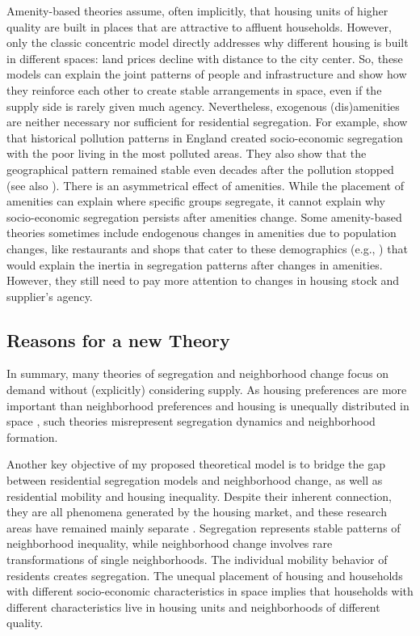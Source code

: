 \documentclass[a4paper,12pt]{article}
\begin{document}
Amenity-based theories assume, often implicitly, that housing units of higher quality are built in places that are attractive to affluent households. However, only the classic concentric model directly addresses why different housing is built in different spaces: land prices decline with distance to the city center. So, these models can explain the joint patterns of people and infrastructure and show how they reinforce each other to create stable arrangements in space, even if the supply side is rarely given much agency. Nevertheless, exogenous (dis)amenities are neither necessary nor sufficient for residential segregation. For example, \citet{heblichEastSideStoryHistorical2021} show that historical pollution patterns in England created socio-economic segregation with the poor living in the most polluted areas. They also show that the geographical pattern remained stable even decades after the pollution stopped (see also \cite{ruttenauerEnvironmentalInequalityResidential2021}). There is an asymmetrical effect of amenities. While the placement of amenities can explain where specific groups segregate, it cannot explain why socio-economic segregation persists after amenities change. Some amenity-based theories sometimes include endogenous changes in amenities due to population changes, like restaurants and shops that cater to these demographics (e.g., \cite{bruecknerWhyCentralParis1999}) that would explain the inertia in segregation patterns after changes in amenities. However, they still need to pay more attention to changes in housing stock and supplier's agency.


\subsection{Reasons for a new Theory}

In summary, many theories of segregation and neighborhood change focus on demand without (explicitly) considering supply. As housing preferences are more important than neighborhood preferences \citep{chauCriticalReviewLiterature2003, bayerEquilibriumModelSorting2004, mummoloWhyPartisansNot2017, delucaNotJustLateral2020} and housing is unequally distributed in space \citep{loufPatternsResidentialSegregation2016, oecdDividedCitiesUnderstanding2018, owensBuildingInequalityHousing2019}, such theories misrepresent segregation dynamics and neighborhood formation. 

Another key objective of my proposed theoretical model is to bridge the gap between residential segregation models and neighborhood change, as well as residential mobility and housing inequality. Despite their inherent connection, they are all phenomena generated by the housing market, and these research areas have remained mainly separate \citep{hwangThingsChangeThings2016}. Segregation represents stable patterns of neighborhood inequality, while neighborhood change involves rare transformations of single neighborhoods. The individual mobility behavior of residents creates segregation. The unequal placement of housing and households with different socio-economic characteristics in space implies that households with different characteristics live in housing units and neighborhoods of different quality.
\end{document}
